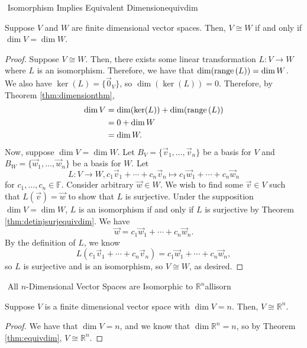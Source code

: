         \begin{theorem}{\Stop\,\,Isomorphism Implies Equivalent Dimension}{equivdim}

            Suppose \(V\) and \(W\) are finite dimensional vector spaces. Then, \(V\cong W\) if and only if \(\dim V=\dim W\).
            \begin{proof}
                Suppose \(V\cong W\). Then, there exists some linear transformation \(L:V\to W\) where \(L\) is an isomorphism. Therefore, we have that \(\dim(\text{range\,}(L))=\dim W\). We also have \(\ker(L)=\{\vec{0}_V\}\), so \(\dim(\ker(L))=0\). Therefore, by Theorem \ref{thm:dimensionthm},
                \begin{align*}
                    \dim V&=\dim(\ker(L))+\dim(\text{range\,}(L)) \\
                    &=0+\dim W \\
                    &=\dim W.
                \end{align*}
                Now, suppose \(\dim V=\dim W\). Let \(B_V=\{\vec{v}_1,\ldots,\vec{v}_n\}\) be a basis for \(V\) and \(B_W=\{\vec{w}_1,\ldots,\vec{w}_n\}\) be a basis for \(W\). Let 
                \begin{equation*}
                    L:V\to W, c_1\vec{v}_1+\cdots+c_n\vec{v}_n\mapsto c_1\vec{w}_1+\cdots+c_n\vec{w}_n
                \end{equation*}
                for \(c_1,\ldots,c_n\in\mathbb{F}\). Consider arbitrary \(\vec{w}\in W\). We wish to find some \(\vec{v}\in V\) such that \(L(\vec{v})=\vec{w}\) to show that \(L\) is surjective. Under the supposition \(\dim V=\dim W\), \(L\) is an isomorphism if and only if \(L\) is surjective by Theorem \ref{thm:detinjsurjequivdim}. We have
                \begin{equation*}
                    \vec{w}=c_1\vec{w}_1+\cdots+c_n\vec{w}_n.
                \end{equation*}
                By the definition of \(L\), we know
                \begin{equation*}
                    L(c_1\vec{v}_1+\cdots+c_n\vec{v}_n)=c_1\vec{w}_1+\cdots+c_n\vec{w}_n,
                \end{equation*}
                so \(L\) is surjective and is an isomorphism, so \(V\cong W\), as desired.
            \end{proof}
            
        \end{theorem}
        \begin{theorem}{\Stop\,\,All \(n\)-Dimensional Vector Spaces are Isomorphic to \(\mathbb{R}^n\)}{allisorn}
            
            Suppose \(V\) is a finite dimensional vector space with \(\dim V=n\). Then, \(V\cong \mathbb{R}^n\).
            \begin{proof}
                We have that \(\dim V=n\), and we know that \(\dim\mathbb{R}^n=n\), so by Theorem \ref{thm:equivdim}, \(V\cong\mathbb{R}^n\).
            \end{proof}

        \end{theorem}

